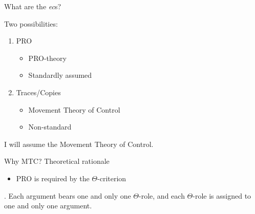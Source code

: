 \documentclass[Proposal]{subfiles}
\begin{document}
\begin{frame}
  {What are the \textit{ec}s?}
  \begin{block}
    {Two possibilities:}
    \begin{enumerate}
      \item PRO
	\begin{itemize}
	  \item PRO-theory \parencite{chomsky1981lectures,culicover2001control,landau2003movement}
	  \item Standardly assumed
	\end{itemize}
      \item Traces/Copies
	\begin{itemize}
	  \item Movement Theory of Control \parencite{hornstein1999movement,boeckx2003reply,boeckx2006virtues}
	  \item Non-standard
	\end{itemize}
    \end{enumerate}
  \end{block}
\pause
I will assume the Movement Theory of Control.
\end{frame}
\begin{frame}
  {Why MTC?}
  {Theoretical rationale \parencite[see also][]{hornstein2001move}}

  \begin{itemize}
    \item PRO is required by the $\Theta$-criterion
  \end{itemize}
  \ex. Each argument bears one and only one $\Theta$-role, and each $\Theta$-role is assigned to one and only one argument. \parencite[36]{chomsky1981lectures}

\end{frame}
\end{document}
